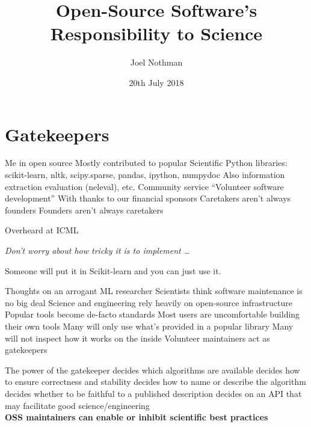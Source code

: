\documentclass[aspectratio=169, 22pt]{beamer}
\title{Open-Source Software's Responsibility to Science}
\subtitle{}
\date{20th July 2018}
\author{Joel Nothman}
\newcommand{\hl}{\textcolor{usydred}}
\begin{document}
\titleslide

\section{Gatekeepers}

\begin{points}{Me in open source}
	\p Mostly contributed to popular Scientific Python libraries:\\
	scikit-learn, nltk, scipy.sparse, pandas, ipython, numpydoc
	\p Also information extraction evaluation (neleval), etc.
	\vfill
	\p Community service
	\p ``Volunteer software development''
	\p With thanks to our financial sponsors
	\vfill
	\p Caretakers aren't always founders
	\p Founders aren't always caretakers
\end{points}

\begin{centre}{Overheard at ICML}
	\parbox{\textwidth}{
		\Large
		\it
	Don't worry about how tricky it is to implement \ldots

	\vspace{2em}

	\raggedleft Someone will put it in Scikit-learn and you can just use it.
	}
\end{centre}

\begin{points}{Thoughts on an arrogant ML researcher}
	\p Scientists think software maintenance is no big deal
	\pause
	\vfill
	\p Science and engineering rely heavily on open-source infrastructure
	\p Popular tools become de-facto standards
	\vfill
	\p Most users are uncomfortable building their own tools
	\p Many will only use what's provided in a popular library
	\p Many will not inspect how it works on the inside
	\vfill
	\p Volunteer maintainers act as gatekeepers
\end{points}

\begin{points}{The power of the gatekeeper}
	\p decides \hl{which algorithms} are available
	\p decides how to ensure \hl{correctness} and stability
	\p decides how to \hl{name} or describe the algorithm
	\p decides whether to be \hl{faithful} to a published description
	\p decides on an \hl{API} that may facilitate good science/engineering
	\\
	\pause
	\vspace{2em}
	\hl{\bf OSS maintainers can enable or inhibit scientific best practices}
\end{points}
\end{document}
